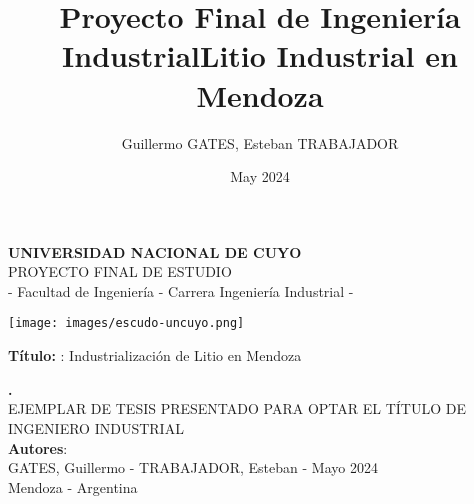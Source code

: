 \documentclass[12pt,a4paper,oneside]{book}
\title{Proyecto Final de Ingeniería Industrial}
\author{Guillermo GATES, Esteban TRABAJADOR}
\date{May 2024}
\begin{document}

\marginsize{3.0cm}{3.0cm}{4.0cm}{3.0cm}
\renewcommand*{\contentsname}{ÍNDICE}
\renewcommand*{\listtablename}{Índice de tablas}
\renewcommand*{\listfigurename}{Índice de figuras}
\renewcommand{\baselinestretch}{1.0}
\renewcommand{\appendixname}{Anexos}
\renewcommand{\appendixtocname}{Anexos}
\renewcommand{\appendixpagename}{Anexos}
\renewcommand{\thetable}{\arabic{chapter}.\arabic{table}}
\renewcommand*{\tablename}{Tabla}
\renewcommand*{\chaptername}{Capítulo}
\renewcommand*{\thechapter}{\Roman{chapter}}
\renewcommand{\thesection}{\arabic{chapter}.\arabic{section}}
\renewcommand{\figurename}{Figura}
\renewcommand{\thefigure}{\arabic{chapter}.\arabic{figure}}
\renewcommand{\theequation}{\arabic{chapter}.\arabic{equation}}




\begin{titlepage}
 
\begin{center}
 
 {\huge \bf UNIVERSIDAD NACIONAL DE CUYO}\\[1.2cm]
 
{\Large PROYECTO FINAL DE ESTUDIO}\\{\Large  -  Facultad de Ingeniería - Carrera Ingeniería Industrial -}\\[2.0cm]


\begin{center}
\texttt{[image: images/escudo-uncuyo.png]}
\end{center}

\vspace{1.7cm}
{{\bf Título: }: }Industrialización de Litio en Mendoza
\title{Litio Industrial en Mendoza} %
{\bf \large . }\\[1.7cm] %


{EJEMPLAR DE TESIS PRESENTADO PARA OPTAR EL TÍTULO DE INGENIERO INDUSTRIAL}\\[0.5cm]
 
{{\bf Autores}: }\\[0.5cm] %

{\large GATES, Guillermo - TRABAJADOR, Esteban - Mayo 2024}\\[0.8cm] %
{Mendoza - Argentina}
\end{center}

\end{titlepage}
\end{document}
